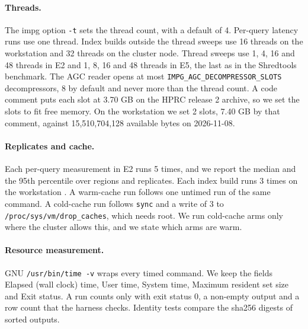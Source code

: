 \paragraph{Threads.}
The impg option \texttt{-t} sets the thread count, with a default of 4.
Per-query latency runs use one thread.
Index builds outside the thread sweeps use 16 threads on the workstation and 32 threads on the cluster node.
Thread sweeps use 1, 4, 16 and 48 threads in E2 and 1, 8, 16 and 48 threads in E5, the last as in the Shredtools benchmark.
The AGC reader opens at most \texttt{IMPG\_AGC\_DECOMPRESSOR\_SLOTS} decompressors, 8 by default and never more than the thread count.
A code comment puts each slot at 3.70 GB on the HPRC release 2 archive, so we set the slots to fit free memory.
On the workstation we set 2 slots, 7.40 GB by that comment, against 15,510,704,128 available bytes on 2026-11-08.

\paragraph{Replicates and cache.}
Each per-query measurement in E2 runs 5 times, and we report the median and the 95th percentile over regions and replicates.
Each index build runs 3 times on the workstation .
A warm-cache run follows one untimed run of the same command.
A cold-cache run follows \texttt{sync} and a write of 3 to \texttt{/proc/sys/vm/drop\_caches}, which needs root.
We run cold-cache arms only where the cluster allows this, and we state which arms are warm.

\paragraph{Resource measurement.}
GNU \texttt{/usr/bin/time -v} wraps every timed command.
We keep the fields Elapsed (wall clock) time, User time, System time, Maximum resident set size and Exit status.
A run counts only with exit status 0, a non-empty output and a row count that the harness checks.
Identity tests compare the sha256 digests of sorted outputs.

